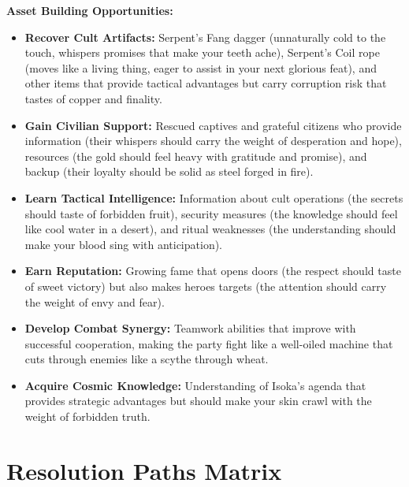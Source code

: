 \documentclass[11pt]{article}
\begin{document}
\textbf{Asset Building Opportunities:}
\begin{itemize}
\item \textbf{Recover Cult Artifacts:} Serpent's Fang dagger (unnaturally cold to the touch, whispers promises that make your teeth ache), Serpent's Coil rope (moves like a living thing, eager to assist in your next glorious feat), and other items that provide tactical advantages but carry corruption risk that tastes of copper and finality.
\item \textbf{Gain Civilian Support:} Rescued captives and grateful citizens who provide information (their whispers should carry the weight of desperation and hope), resources (the gold should feel heavy with gratitude and promise), and backup (their loyalty should be solid as steel forged in fire).
\item \textbf{Learn Tactical Intelligence:} Information about cult operations (the secrets should taste of forbidden fruit), security measures (the knowledge should feel like cool water in a desert), and ritual weaknesses (the understanding should make your blood sing with anticipation).
\item \textbf{Earn Reputation:} Growing fame that opens doors (the respect should taste of sweet victory) but also makes heroes targets (the attention should carry the weight of envy and fear).
\item \textbf{Develop Combat Synergy:} Teamwork abilities that improve with successful cooperation, making the party fight like a well-oiled machine that cuts through enemies like a scythe through wheat.
\item \textbf{Acquire Cosmic Knowledge:} Understanding of Isoka's agenda that provides strategic advantages but should make your skin crawl with the weight of forbidden truth.
\end{itemize}

\section{Resolution Paths Matrix}
\end{document}
